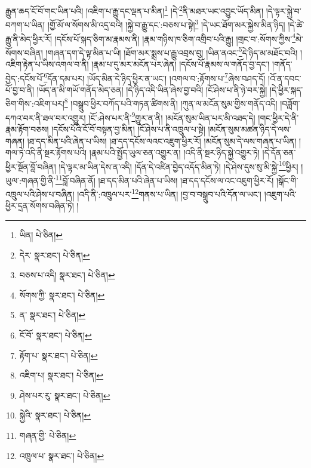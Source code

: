 རྒྱུན་ཆད་ངོ་བོ་གང་ཡིན་པའི། །འཇིག་པ་རྒྱུ་དང་ལྡན་པ་མིན།\footnote{ཡིན།  པེ་ཅིན། } །དེ་\footnote{དེར་  སྣར་ཐང་།  པེ་ཅིན། }ནི་མཐར་ཡང་འབྱུང་ཡོད་མིན། །དེ་ལྟར་སྐྱེ་བ་བཀག་པ་ཡིན། །གྱོ་མོ་ལ་སོགས་མི་འདྲ་བའི། །སྐྱེ་བ་རྒྱུ་དང་:བཅས་པ་སྟེ།\footnote{བཅས་པ་འདི།  སྣར་ཐང་།  པེ་ཅིན། } །དེ་ཡང་ཐོག་མར་སྐྱེས་མིན་ཉིད། །དེ་ཚེ་རྒྱུ་ནི་མེད་ཕྱིར་རོ། །དངོས་པོ་སྐད་ཅིག་མ་རྣམས་ནི། །རྣམ་གཉིས་ཁ་ཅིག་འགྲིབ་པའི་རྒྱུ། །གྲང་བ་:སོགས་ཀྱིས་\footnote{སོགས་ཀྱི་  སྣར་ཐང་།  པེ་ཅིན། }མེ་སོགས་བཞིན། །གཞན་དག་དེ་ལྟ་མིན་པ་ཡི། །ཐོག་མར་སྨྲས་པ་རྒྱུ་འབྲས་བུ། །ཡིན་ནའང་\footnote{ན་  སྣར་ཐང་།  པེ་ཅིན། }དེ་ཉིད་མ་མཐོང་བའི། །འཇིག་རྟེན་པ་ཡིས་འགལ་བ་ནི། །རྣམ་པ་དུ་མར་མངོན་པར་ཞེན། །དངོས་པོ་རྣམས་ལ་གནོད་བྱ་དང་། །གནོད་བྱེད་:དངོས་པོ་\footnote{ངོ་བོ་  སྣར་ཐང་།  པེ་ཅིན། }དོན་དམ་པར། །ཡོད་མིན་དེ་ཉིད་ཕྱིར་ན་ཡང་། །འགལ་བ་:རྟོགས་པ་\footnote{རྟོག་པ་  སྣར་ཐང་།  པེ་ཅིན། }ཞེས་བཤད་དོ། །འོ་ན་དབང་པོ་བྱ་བ་ནི། །ཡོད་ན་མི་གཡོ་གནོད་མེད་ཅན། །དེ་ཉིད་འདི་ཡིན་ཞེས་བྱ་བའི། །ངོ་ཤེས་པ་ནི་ཉེ་བར་སྐྱེ། །དེ་ཕྱིར་སྐད་ཅིག་གིས་:འཇིག་པར།\footnote{འཇིག་པ།  སྣར་ཐང་།  པེ་ཅིན། } །བསྒྲུབ་ཕྱིར་བཀོད་པའི་གཏན་ཚིགས་ནི། །ཀུན་ལ་མངོན་སུམ་གྱིས་གནོད་འདི། །བཟློག་དཀའ་བར་ནི་ཐལ་བར་འགྱུར། །ངོ་:ཤེས་པར་ནི་\footnote{ཤེས་པར་རུ་  སྣར་ཐང་།  པེ་ཅིན། }གྱུར་ན་ནི། །མངོན་སུམ་ཡིན་པར་མི་འཐད་དེ། །གང་ཕྱིར་དེ་ནི་རྣམ་རྟོག་བཅས། །དངོས་པོའི་ངོ་བོ་བསྟན་བྱ་མིན། །ངོ་ཤེས་པ་ནི་འཁྲུལ་པ་སྟེ། །མངོན་སུམ་མཚན་ཉིད་དེ་ལས་གཞན། །ཐ་དད་མིན་པའི་ཞེན་པ་ཡིས། །ཐ་དད་དངོས་ལའང་འཇུག་ཕྱིར་རོ། །མངོན་སུམ་དེ་ལས་གཞན་པ་ཡིན། །གལ་ཏེ་འདི་ནི་སྔར་རྟོགས་པའི། །རྣམ་པའི་སྤྱོད་ཡུལ་ཅན་འགྱུར་ན། །འདི་ནི་སྔར་ཉིད་སྐྱེ་འགྱུར་ཏེ། །དེ་དོན་ཅན་ཕྱིར་སྔོན་བློ་བཞིན། །དེ་ལྟར་མ་ཡིན་དེས་ན་འདི། །དོན་དེ་འཛིན་བྱེད་འདོད་མིན་ཏེ། །དེ་ཤེས་དུས་སུ་མི་སྐྱེ་\footnote{སྐྱེའི་  སྣར་ཐང་།  པེ་ཅིན། }ཕྱིར། །ཡུལ་:གཞན་གྱི་ནི་\footnote{གཞན་གྱི་  པེ་ཅིན། }བློ་བཞིན་ནོ། །ཐ་དད་མིན་པའི་ཞེན་པ་ཡིས། །ཐ་དད་དངོས་ལ་འང་འཇུག་ཕྱིར་རོ། །སྒོང་གི་འཁྲུལ་པའི་ཤེས་པ་བཞིན། །འདི་ནི་:འཁྲུལ་པར་\footnote{འཁྲུལ་པ་  སྣར་ཐང་།  པེ་ཅིན། }གནས་པ་ཡིན། །བྱ་བ་བསྒྲུབ་པའི་དོན་ལ་ཡང་། །འཇུག་པའི་ཕྱིར་དྲན་སོགས་བཞིན་ཏེ། །
